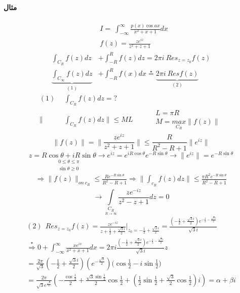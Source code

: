 \paragraph{مثال}
\begin{align*}
&I= \ \int_{-\infty}^{\infty} \frac {p(x) \cos ax }{x^{2}+x+1} dx \\
&f(z) = \frac {ze^{iz}}{z^{2}+z+1}
\end{align*}
\begin{align*}
	\int_{C_{R}}f(z)dz &+\int_{-R}^{R} f(z)dz = 2\pi i\ Res_{z=z_{0}} f(z) \\
\underbrace{\int_{C_{\infty}}f(z)dz}_{(1)} &+\int_{-R}^{R} f(x)dx \overset{\star}{=} \underbrace{2\pi i\ Res f(z)}_{(2)}
\end{align*}
\begin{align*}
(1) \  \ &\int_{C_{R}}f(z)dz=? \\
\| &\int_{C_{R}}f(z)dz \| \leq ML
\quad \quad 
\begin{aligned}
&L=\pi R \\
&M=\underset{C_R}{max}\|f(z)\|
\end{aligned}
\end{align*}
\begin{equation*}
	\|f(z)\| = \| \frac{ze^{iz}}{z^{2}+z+1}\| \leq \frac{R}{R^{2}-R+1}\|e^{iz}\|
\end{equation*}
\begin{equation*}
	z=\underset{
	\begin{aligned}
	0 \leq \theta \leq\pi \\
	\sin \theta \geq 0	
	\end{aligned}
	}{R \cos \theta +iR \sin \theta}\rightarrow e^{iz}=e^{iR \cos \theta}e^{-R \sin \theta} \rightarrow  \|e^{iz}\|=e^{-R \sin \theta}
\end{equation*}
\begin{align*}
	\Rightarrow \|f(z)\|_{on\ c_{R}} \leq  \frac{Re^{-R \sin \theta}}{R^{2}-R+1} \Rightarrow \|\int_{c_{R}} f(z)dz\| \leq  \frac{\pi R^{2}e^{-R \sin \theta}}{R^{2}-R+1}
\end{align*}
\begin{equation*}
\rightarrow \underset{\underset{R\rightarrow \infty}{C_R}}{\int} \frac{ze^{-iz}}{z^{2}-z+1}dz=0	
\end{equation*}
\begin{align*}
	(2) \ \ Res_{z=z_{0}} f(z) =\frac{ze^{-iz}}{z+\frac{1}{2}  +\frac{\sqrt{3} i}{2}} |_{z_{0}=-\frac{1}{2}  +\frac{\sqrt{3} i}{2}} = \frac {(-\frac{1}{2}  +\frac{\sqrt{3} i}{2})e^{-\frac{1}{2}  -\frac{\sqrt{3} i}{2}}}{\sqrt{3} i} \\
	\overset{\star}{\Rightarrow} 0+ \int_{-\infty}^{\infty} \frac{xe^{ix}}{x^{2}+x+1}dx=2\pi i \frac {(-\frac{1}{2}  +\frac{\sqrt{3} i}{2})e^{-\frac{1}{2}  -\frac{\sqrt{3} i}{2}}}{\sqrt{3} i}z \\
=\frac{2 \pi}{\sqrt{3}}(-\frac{1}{2}  +\frac{\sqrt{3} i}{2}){(e^{-\frac{\sqrt{3}}{2}})(\cos \frac {1}{2} - i \sin \frac {1}{2}}) \\
=\frac{2 \pi}{\sqrt{3} e^{\frac{\sqrt{3}}{2}}}(- \frac{\cos \frac {1}{2}}{2} +\frac{\sqrt{3} \sin \frac {1}{2}}{2} \cos \frac {1}{2}+ (\frac{1}{2}\sin \frac {1}{2}   + \frac{\sqrt{3}}{2}\cos \frac {1}{2})i) = \alpha +\beta i
\end{align*} 
